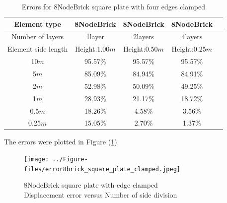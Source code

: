 \documentclass[fleqn,11pt]{article}
\begin{document}
\begin{table}[H]
  \centering
  \caption{Errors for 8NodeBrick square plate with four edges clamped}
  \label{table Errors for 8NodeBrick square plate with four edges clamped}
\begin{tabular}{|c|c|c|c|c|}
\hline
Element type     & 8NodeBrick     & 8NodeBrick     & 8NodeBrick      \\ \hline
Number of layers & 1layer         & 2layers         & 4layers          \\ \hline
Element side length & Height:1.00$m$ & Height:0.50$m$ & Height:0.25$m$  \\ \hline
10$m$            & 95.57\%        & 95.57\%        & 95.57\%        \\ \hline
5$m$             & 85.09\%        & 84.94\%        & 84.91\%        \\ \hline
2$m$             & 52.98\%        & 50.09\%        & 49.25\%        \\ \hline
1$m$             & 28.93\%        & 21.17\%        & 18.72\%        \\ \hline
0.5$m$           & 18.26\%        & 4.58\%         & 3.56\%         \\ \hline
0.25$m$          & 15.05\%        & 2.70\%         & 1.37\%         \\
\hline
\end{tabular}
\end{table}





The errors were plotted in Figure (\ref{fig 8NodeBrick square plate with edge clamped}).
\begin{figure}[H]
    \centering
    \texttt{[image: ../Figure-files/error8brick\_square\_plate\_clamped.jpeg]}
  \captionsetup{justification=centering,margin=3cm}
  \caption{8NodeBrick square plate with edge clamped\\
      Displacement error   versus   Number of side division}
  \label{fig 8NodeBrick square plate with edge clamped}
\end{figure}
\end{document}
